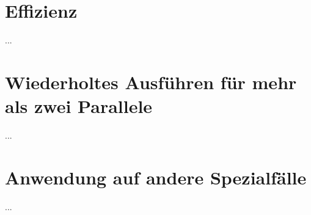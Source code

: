 \documentclass[../main/thesis.tex]{subfiles}
\begin{document}
\section{Effizienz}

...



\section{Wiederholtes Ausführen für mehr als zwei Parallele}

...



\section{Anwendung auf andere Spezialfälle}

...



\end{document}
